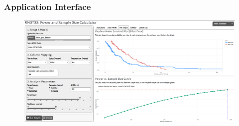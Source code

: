 \documentclass{beamer}
\begin{document}
\begin{frame}
\frametitle{Application Interface}
\begin{figure}
\includegraphics[width=\textwidth, height = 0.65\textwidth]{images/app-ss.png}
\end{figure}
\end{frame}
\end{document}
